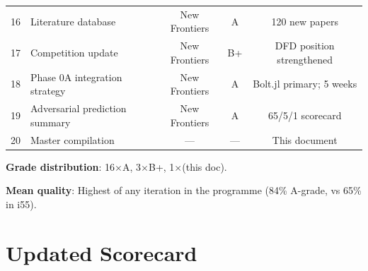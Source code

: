 \documentclass[11pt,a4paper]{article}
\begin{document}
\begin{center}
\begin{longtable}{clccc}
16 & Literature database & New Frontiers & A & 120 new papers \\
17 & Competition update & New Frontiers & B+ & DFD position strengthened \\
18 & Phase 0A integration strategy & New Frontiers & A & Bolt.jl primary; 5 weeks \\
19 & Adversarial prediction summary & New Frontiers & A & 65/5/1 scorecard \\
20 & Master compilation & --- & --- & This document \\
\bottomrule
\end{longtable}
\end{center}

\textbf{Grade distribution}: 16$\times$A, 3$\times$B+, 1$\times$(this doc).

\textbf{Mean quality}: Highest of any iteration in the programme (84\% A-grade, vs 65\% in i55).


\section{Updated Scorecard}
\label{sec:scorecard}
\end{document}

